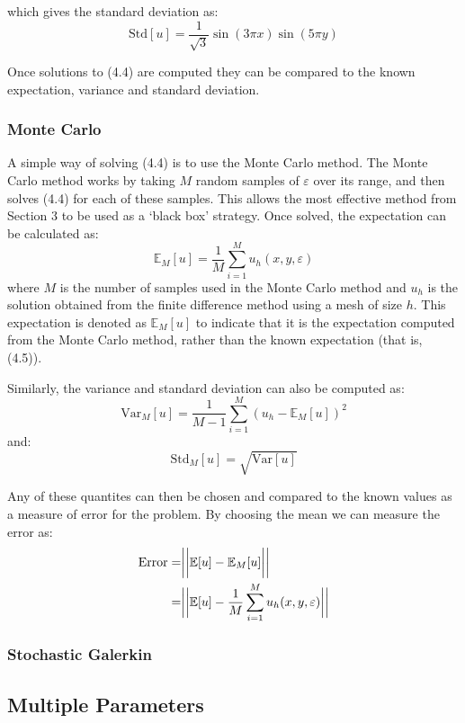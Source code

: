 \documentclass{article}
\numberwithin{equation}{section}
\begin{document}
which gives the standard deviation as:
\begin{equation}
\text{Std}[u] = \frac{1}{\sqrt{3}} \sin(3 \pi x) \sin(5 \pi y)
\end{equation}

Once solutions to (4.4) are computed they can be compared to the known expectation, variance and standard deviation.

\subsubsection{Monte Carlo}
A simple way of solving (4.4) is to use the Monte Carlo method. The Monte Carlo method works by taking $M$ random samples of $\varepsilon$ over its range, and then solves (4.4) for each of these samples. 
This allows the most effective method from Section 3 to be used as a `black box' strategy. Once solved, the expectation can be calculated as:
\begin{equation}
\mathbb{E}_M[u] = \frac{1}{M} \sum_{i=1}^M u_h (x, y, \varepsilon)
\end{equation}
where $M$ is the number of samples used in the Monte Carlo method and $u_h$ is the solution obtained from the finite difference method using a mesh of size $h$. This expectation is denoted as $\mathbb{E}_M[u]$ to indicate that it is the expectation computed from the Monte Carlo method, rather than the known expectation (that is, (4.5)). 

Similarly, the variance and standard deviation can also be computed as:
\begin{equation}
\text{Var}_M[u] = \frac{1}{M-1}\sum_{i=1}^M (u_h - \mathbb{E}_M[u])^2
\end{equation}
and:
\begin{equation}
\text{Std}_M[u] = \sqrt{\text{Var}[u]}
\end{equation}


Any of these quantites can then be chosen and compared to the known values as a measure of error for the problem. By choosing the mean we can measure the error as:
\begin{equation}
\begin{split}
\text{Error} = & \bigg{|} \bigg{|} \mathbb{E}[u] - \mathbb{E}_M[u] \bigg{|} \bigg{|} \\
= & \bigg{|} \bigg{|} \mathbb{E}[u] - \frac{1}{M} \sum_{i=1}^M u_h (x, y, \varepsilon) \bigg{|}\bigg{|}
\end{split}
\end{equation}


\subsubsection{Stochastic Galerkin}

\subsection{Multiple Parameters}

\newpage



\end{document}
